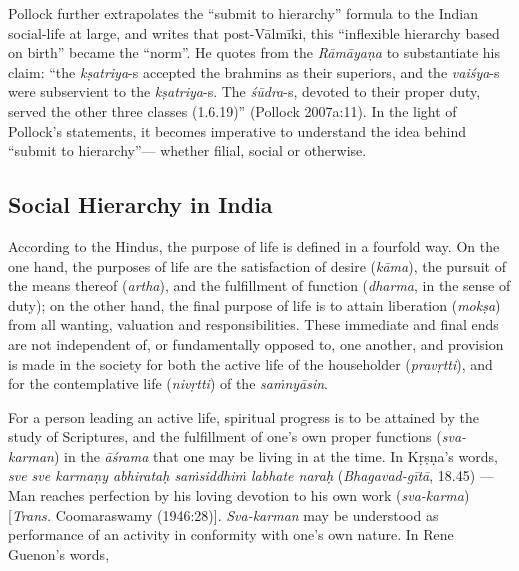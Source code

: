 Pollock further extrapolates the “submit to hierarchy” formula to the Indian social-life at large, and writes that post-Vālmīki, this “inflexible hierarchy based on birth” became the “norm”. He quotes from the {\sl Rāmāyaṇa} to substantiate his claim: “the {\sl kṣatriya}-s accepted the brahmins as their superiors, and the {\sl vaiśya}-s were subservient to the {\sl kṣatriya}-s. The {\sl śūdra}-s, devoted to their proper duty, served the other three classes (1.6.19)'' (Pollock 2007a:11). In the light of Pollock’s statements, it becomes imperative to understand the idea behind “submit to hierarchy”— whether filial, social or otherwise.\\[-20pt] 

\subsection[Social Hierarchy in India]{Social Hierarchy in India}\label{sec1.3.1}

According to the Hindus, the purpose of life is defined in a fourfold way. On the one hand, the purposes of life are the satisfaction of desire ({\sl kāma}), the pursuit of the means thereof ({\sl artha}), and the fulfillment of function ({\sl dharma}, in the sense of duty); on the other hand, the final purpose of life is to attain liberation ({\sl mokṣa}) from all wanting, valuation and responsibilities. These immediate and final ends are not independent of, or fundamentally opposed to, one another, and provision is made in the society for both the active life of the householder ({\sl pravṛtti}), and for the contemplative life ({\sl nivṛtti}) of the {\sl saṁnyāsin}.  

For a person leading an active life, spiritual progress is to be attained by the study of Scriptures, and the fulfillment of one’s own proper functions ({\sl sva-karman}) in the {\sl āśrama} that one may be living in at the time. In Kṛṣṇa’s words, {\sl sve sve karmaṇy abhirataḥ saṁsiddhiṁ labhate naraḥ} ({\sl Bhagavad-gītā}, 18.45) — Man reaches perfection by his loving devotion to his own work ({\sl sva-karma}) [{\sl Trans.} Coomaraswamy (1946:28)]. {\sl Sva-karman} may be understood as performance of an activity in conformity with one’s own nature. In Rene Guenon’s words, 

